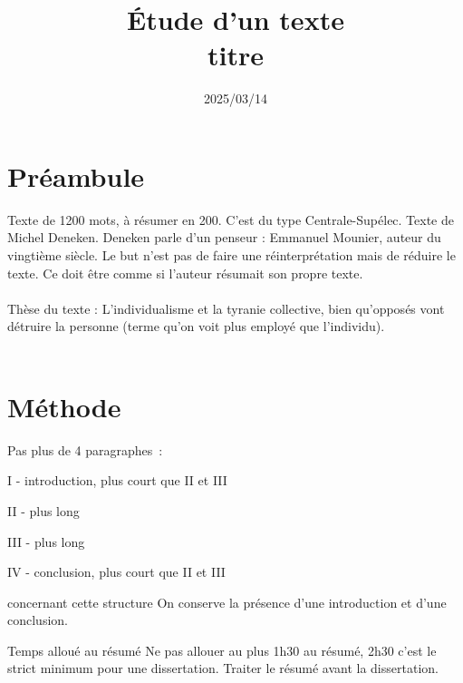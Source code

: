 

\title{\Large Étude d'un texte \\ \Huge titre}
\date{2025/03/14}


\maketitle

\section{Préambule}

Texte de 1200 mots, à résumer en 200. C'est du type Centrale-Supélec. Texte de Michel Deneken. Deneken parle d'un penseur : Emmanuel Mounier, auteur du vingtième siècle. Le but n'est pas de faire une réinterprétation mais de réduire le texte. Ce doit être comme si l'auteur résumait son propre texte.\\\\

Thèse du texte : L'individualisme et la tyranie collective, bien qu'opposés vont détruire la personne (terme qu'on voit plus employé que l'individu).\\\\

\section{Méthode}
Pas plus de 4 paragraphes~:
\begin{enumeratebf}
    \item I - introduction, plus court que II et III
    \item II - plus long
    \item III - plus long
    \item IV - conclusion, plus court que II et III
\end{enumeratebf}

\begin{remarque}{1}{concernant cette structure}
    On conserve la présence d'une introduction et d'une conclusion.
\end{remarque}

\begin{remarque}{2}{Temps alloué au résumé}
    Ne pas allouer au plus 1h30 au résumé, 2h30 c'est le strict minimum pour une dissertation. Traiter le résumé avant la dissertation.
\end{remarque}

